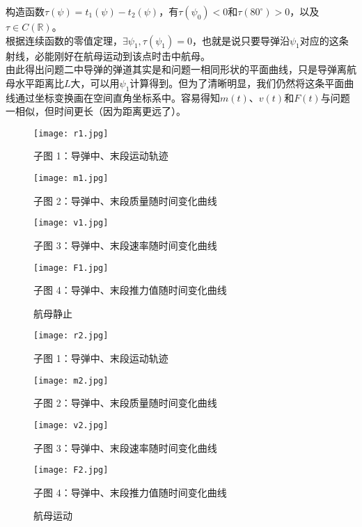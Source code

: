 \documentclass[UTF8]{article}
\begin{document}
\indent 构造函数\(\tau(\psi)=t_1(\psi)-t_2(\psi)\)，有\(\tau(\psi_0)<0\)和\(\tau(80^\circ)>0\)，以及\(\tau\in C(\mathbb{R})\)。\\
\indent 根据连续函数的零值定理，\(\exists\psi_1,\tau(\psi_1)=0\)，也就是说只要导弹沿\(\psi_1\)对应的这条射线，必能刚好在航母运动到该点时击中航母。\\
\indent 由此得出问题二中导弹的弹道其实是和问题一相同形状的平面曲线，只是导弹离航母水平距离比\(L\)大，可以用\(\psi_1\)计算得到。但为了清晰明显，我们仍然将这条平面曲线通过坐标变换画在空间直角坐标系中。容易得知\(m(t)\)、\(v(t)\)和\(F(t)\)与问题一相似，但时间更长（因为距离更远了）。
\begin{figure}[htbp]
\centering
\begin{minipage}[htbp]{7cm}
\centering
\texttt{[image: r1.jpg]}
\caption*{子图 1：导弹中、末段运动轨迹}
\end{minipage}
\begin{minipage}[htbp]{7cm}
\centering
\texttt{[image: m1.jpg]}
\caption*{子图 2：导弹中、末段质量随时间变化曲线}
\end{minipage}
\begin{minipage}[htbp]{7cm}
\centering
\texttt{[image: v1.jpg]}
\caption*{子图 3：导弹中、末段速率随时间变化曲线}
\end{minipage}
\begin{minipage}[htbp]{7cm}
\centering
\texttt{[image: F1.jpg]}
\caption*{子图 4：导弹中、末段推力值随时间变化曲线}
\end{minipage}
\caption{航母静止}
\end{figure}
\begin{figure}[htbp]
\centering
\begin{minipage}[htbp]{7cm}
\centering
\texttt{[image: r2.jpg]}
\caption*{子图 1：导弹中、末段运动轨迹}
\end{minipage}
\begin{minipage}[htbp]{7cm}
\centering
\texttt{[image: m2.jpg]}
\caption*{子图 2：导弹中、末段质量随时间变化曲线}
\end{minipage}
\begin{minipage}[htbp]{7cm}
\centering
\texttt{[image: v2.jpg]}
\caption*{子图 3：导弹中、末段速率随时间变化曲线}
\end{minipage}
\begin{minipage}[htbp]{7cm}
\centering
\texttt{[image: F2.jpg]}
\caption*{子图 4：导弹中、末段推力值随时间变化曲线}
\end{minipage}
\caption{航母运动}
\end{figure}\\
\end{document}
